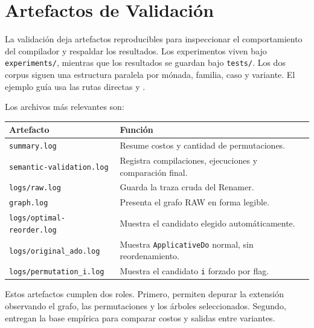 
\section{Artefactos de Validación}

La validación deja artefactos reproducibles para inspeccionar el comportamiento del compilador y respaldar los resultados. Los experimentos viven bajo \texttt{experiments/}, mientras que los resultados se guardan bajo \texttt{tests/}. Los dos corpus siguen una estructura paralela por mónada, familia, caso y variante. El ejemplo guía usa las rutas directas  y .

Los archivos más relevantes son:

\begin{center}
\begin{tabular}{ll}
\hline
Artefacto & Función \\
\hline
\texttt{summary.log} & Resume costos y cantidad de permutaciones. \\
\texttt{semantic-validation.log} & Registra compilaciones, ejecuciones y comparación final. \\
\texttt{logs/raw.log} & Guarda la traza cruda del Renamer. \\
\texttt{graph.log} & Presenta el grafo RAW en forma legible. \\
\texttt{logs/optimal-reorder.log} & Muestra el candidato elegido automáticamente. \\
\texttt{logs/original\_ado.log} & Muestra \texttt{ApplicativeDo} normal, sin reordenamiento. \\
\texttt{logs/permutation\_i.log} & Muestra el candidato \texttt{i} forzado por flag. \\
\hline
\end{tabular}
\end{center}

Estos artefactos cumplen dos roles. Primero, permiten depurar la extensión observando el grafo, las permutaciones y los árboles seleccionados. Segundo, entregan la base empírica para comparar costos y salidas entre variantes.
